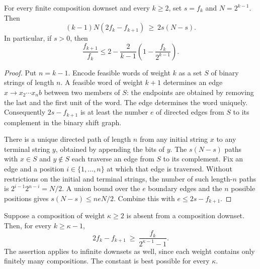 \begin{proposition}
For every finite composition downset and every $k\ge2$, set
$s=f_k$ and $N=2^{k-1}$. Then
\[
 (k-1)N(2f_k-f_{k+1})\ \ge\ 2s(N-s).
\]
In particular, if $s>0$, then
\[
 \frac{f_{k+1}}{f_k}
 \le 2-\frac{2}{k-1}\left(1-\frac{f_k}{2^{k-1}}\right).
\]
\end{proposition}

\begin{proof}
Put $n=k-1$. Encode feasible words of weight $k$ as a set $S$ of binary
strings of length $n$. A feasible word of weight $k+1$ determines an
edge $x\longrightarrow x_2\cdots x_n b$ between two members of $S$:
the endpoints are obtained by removing the last and the first unit of
the word. The edge determines the word uniquely. Consequently
$2s-f_{k+1}$ is at least the number $e$ of directed edges from $S$ to
its complement in the binary shift graph.

There is a unique directed path of length $n$ from any initial string
$x$ to any terminal string $y$, obtained by appending the bits of $y$.
The $s(N-s)$ paths with $x\in S$ and $y\notin S$ each traverse an edge
from $S$ to its complement. Fix an edge and a position $i\in\{1,\ldots,n\}$
at which that edge is traversed. Without restrictions on the initial
and terminal strings, the number of such length-$n$ paths is
$2^{i-1}2^{n-i}=N/2$. A union bound over the $e$ boundary edges and
the $n$ possible positions gives $s(N-s)\le neN/2$.
Combine this with $e\le2s-f_{k+1}$.
\end{proof}

\begin{theorem}
Suppose a composition of weight $\kappa\ge2$ is absent from a
composition downset. Then, for every $k\ge\kappa-1$,
\[
 2f_k-f_{k+1}\ \ge\ \frac{f_k}{2^{\kappa-1}-1}.
\]
The assertion applies to infinite downsets as well, since each weight
contains only finitely many compositions. The constant is best possible
for every $\kappa$.
\end{theorem}

